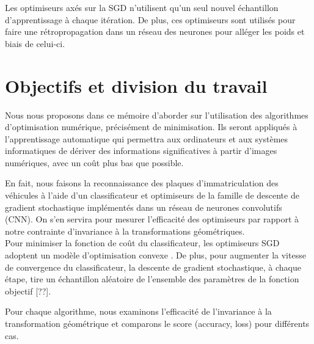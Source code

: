 		Les optimiseurs axés sur la SGD n'utilisent qu'un seul nouvel échantillon d'apprentissage à chaque itération. De plus, ces optimiseurs sont utilisés pour faire une rétropropagation dans un réseau des neurones pour alléger les poids et biais de celui-ci.
		
		
			
	
	\section{Objectifs et division du travail}
		
		Nous nous proposons dans ce mémoire d'aborder sur l'utilisation des algorithmes d'optimisation numérique, précisément de minimisation. Ils seront appliqués à l'apprentissage automatique qui permettra aux ordinateurs et aux systèmes informatiques de dériver des informations significatives à partir d'images numériques, avec un coût plus bas que possible.
		
		En fait, nous faisons la reconnaissance des plaques d’immatriculation des véhicules à l'aide d’un classificateur et optimiseurs de la famille de descente de gradient stochastique implémentés dans un réseau de neurones convolutifs (CNN). On s’en servira pour mesurer l'efficacité des optimiseurs par rapport à notre contrainte d’invariance à la transformations géométriques.\\
		Pour minimiser la fonction de coût du classificateur, les optimiseurs SGD adoptent un modèle d'optimisation convexe \cite{deepa2021ai}. De plus, pour augmenter la vitesse de convergence du classificateur, la descente de gradient stochastique, à chaque étape, tire un échantillon aléatoire de l'ensemble des paramètres de la fonction objectif [??].
		
		Pour chaque algorithme, nous examinons l'efficacité de l’invariance à la transformation géométrique et comparons le score (accuracy, loss) pour différents cas.
		

